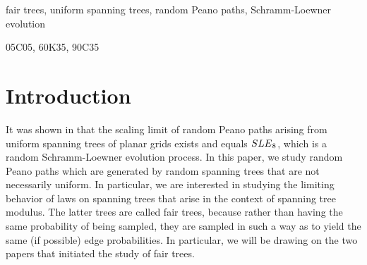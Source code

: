 \documentclass[preprint,12pt]{elsarticle}
\theoremstyle{definition}
\theoremstyle{remark}
\numberwithin{equation}{section}
\begin{document}
\begin{frontmatter}
\begin{keyword}

fair trees, uniform spanning trees, random Peano paths, Schramm-Loewner evolution



05C05, 	60K35, 90C35

\end{keyword}

\end{frontmatter}
%
%
%
%
%
%
%
%
%
%
%
%
%

\section{Introduction}
It was shown in \cite{lawler-schramm-werner2002} that the scaling limit of  random Peano paths arising from uniform spanning trees of planar grids exists and equals  ${\rm SLE}_8$, which is a random Schramm-Loewner evolution process. In this paper, we study random Peano paths which are generated by random spanning trees that are not necessarily uniform. In particular, we are interested in studying the limiting behavior of laws on spanning trees that arise in the context of spanning tree modulus. The latter trees are called fair trees, because rather than having the same probability of being sampled, they are sampled in such a way as to yield the same (if possible) edge probabilities.  In particular, we will be drawing on the two papers \cite{achpcst,alpc} that initiated the study of fair trees. 
\end{document}
